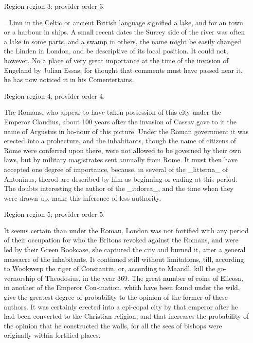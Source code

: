 \documentclass[11pt]{article}
\begin{document}
{\scriptsize\color{gray} Region region-3; provider order 3.\par}
\medskip

\_Linn in the Celtic or ancient British language signified a lake, and for an town or a harbour in ships. A small recent dates the Surrey side of the river was often a lake in some parts, and a swamp in others, the name might be easily changed the Linden in London, and be descriptive of its local position. It could not, however, No a place of very great importance at the time of the invasion of Engeland by Julian Essas; for thought that comments must have passed near it, he has now noticed it in his Comentertains.
\par

{\scriptsize\color{gray} Region region-4; provider order 4.\par}
\medskip

The Romans, who appear to have taken possession of this city under the Emperor Claudius, about 100 years after the invasion of Cassav gave to it the name of Argustus in ho-nour of this picture. Under the Roman government it was erected into a prohecture, and the inhabitants, though the name of citizens of Rome were conferred upon there, were not allowed to be governed by their own laws, but by military magistrates sent annually from Rome. It must then have accepted one degree of importance, because, in several of the \_litterna\_ of Antoninus, therod are described by him as beginning or ending at this period. The doubts interesting the author of the \_itdorea\_, and the time when they were drawn up, make this inference of less authority.
\par

{\scriptsize\color{gray} Region region-5; provider order 5.\par}
\medskip

It seems certain than under the Roman, London was not fortified with any period of their occupation for who the Britons revoked against the Romans, and were led by their Green Bookcase, she captured the city and burned it, after a general massacre of the inhabitants. It continued still without limitations, till, according to Wookwerp the riger of Constantin, or, according to Maandl, kill the go-vernorship of Theodosius, in the year 369. The great number of coins of Elleosa, in another of the Emperor Con-ination, which have been found under the wild, give the greatest degree of probability to the opinion of the former of these authors. It was certainly erected into a epi-copal city by that emperor after he had been converted to the Christian religion, and that increases the probability of the opinion that he constructed the walls, for all the sees of bisbops were originally within fortified places.
\par
\end{document}
